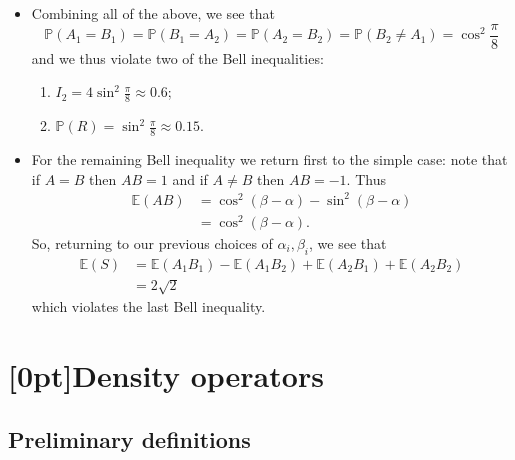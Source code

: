 \documentclass[10pt]{article}
\newcommand{\QI}{\textcolor{pink}{QI}}
\begin{document}
\begin{itemize}
                \item Combining all of the above, we see that
                    \begin{equation*}
                        \mathbb{P}(A_1=B_1)=\mathbb{P}(B_1=A_2)=\mathbb{P}(A_2=B_2)=\mathbb{P}(B_2\neq A_1)=\cos^2\frac{\pi}8
                    \end{equation*}
                    and we thus violate two of the Bell inequalities:
                    \begin{enumerate}[label=(\alph*)]
                        \item $I_2=4\sin^2\frac{\pi}8\approx0.6$;
                        \item $\mathbb{P}(R)=\sin^2\frac{\pi}8\approx0.15$.
                    \end{enumerate}
                \item For the remaining Bell inequality we return first to the simple case: note that if $A=B$ then $AB=1$ and if $A\neq B$ then $AB=-1$.
                    Thus
                    \begin{align*}
                        \mathbb{E}(AB)&=\cos^2(\beta-\alpha)-\sin^2(\beta-\alpha)\\
                        &=\cos^2(\beta-\alpha).
                    \end{align*}
                    So, returning to our previous choices of $\alpha_i,\beta_i$, we see that
                    \begin{align*}
                        \mathbb{E}(S)&=\mathbb{E}(A_1B_1)-\mathbb{E}(A_1B_2)+\mathbb{E}(A_2B_1)+\mathbb{E}(A_2B_2)\\
                        &=2\sqrt2
                    \end{align*}
                    which violates the last Bell inequality.
            \end{itemize}

    \section{\protect\marginnote{\QI}[0pt]Density operators}

        \subsection{Preliminary definitions}
\end{document}
